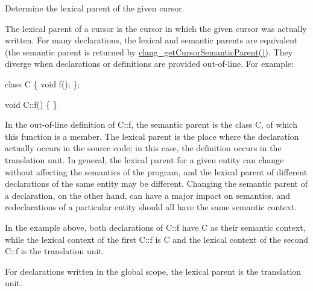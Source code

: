 Determine the lexical parent of the given cursor. 

The lexical parent of a cursor is the cursor in which the given {\ttfamily cursor} was actually written. For many declarations, the lexical and semantic parents are equivalent (the semantic parent is returned by {\ttfamily \hyperlink{group__CINDEX__CURSOR__MANIP_gabc327b200d46781cf30cb84d4af3c877}{clang\+\_\+get\+Cursor\+Semantic\+Parent()}}). They diverge when declarations or definitions are provided out-\/of-\/line. For example\+:


\begin{DoxyCode}
\textcolor{keyword}{class }C \{
 \textcolor{keywordtype}{void} f();
\};

\textcolor{keywordtype}{void} C::f() \{ \}
\end{DoxyCode}


In the out-\/of-\/line definition of {\ttfamily C\+::f}, the semantic parent is the class {\ttfamily C}, of which this function is a member. The lexical parent is the place where the declaration actually occurs in the source code; in this case, the definition occurs in the translation unit. In general, the lexical parent for a given entity can change without affecting the semantics of the program, and the lexical parent of different declarations of the same entity may be different. Changing the semantic parent of a declaration, on the other hand, can have a major impact on semantics, and redeclarations of a particular entity should all have the same semantic context.

In the example above, both declarations of {\ttfamily C\+::f} have {\ttfamily C} as their semantic context, while the lexical context of the first {\ttfamily C\+::f} is {\ttfamily C} and the lexical context of the second {\ttfamily C\+::f} is the translation unit.

For declarations written in the global scope, the lexical parent is the translation unit. \mbox{\label{group__CINDEX__CURSOR__MANIP_gaab07659398c4538771d62c81ca5dea69}} 
